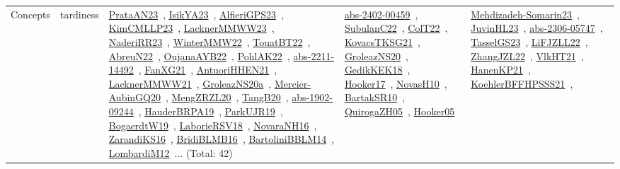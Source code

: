 {\begin{longtable}{lp{3cm}>{\raggedright\arraybackslash}p{6cm}>{\raggedright\arraybackslash}p{6cm}>{\raggedright\arraybackslash}p{8cm}}
Concepts & tardiness & \href{articles/PrataAN23.pdf}{PrataAN23}~\cite{PrataAN23}, \href{articles/IsikYA23.pdf}{IsikYA23}~\cite{IsikYA23}, \href{articles/AlfieriGPS23.pdf}{AlfieriGPS23}~\cite{AlfieriGPS23}, \href{papers/KimCMLLP23.pdf}{KimCMLLP23}~\cite{KimCMLLP23}, \href{articles/LacknerMMWW23.pdf}{LacknerMMWW23}~\cite{LacknerMMWW23}, \href{articles/NaderiRR23.pdf}{NaderiRR23}~\cite{NaderiRR23}, \href{papers/WinterMMW22.pdf}{WinterMMW22}~\cite{WinterMMW22}, \href{papers/TouatBT22.pdf}{TouatBT22}~\cite{TouatBT22}, \href{articles/AbreuN22.pdf}{AbreuN22}~\cite{AbreuN22}, \href{papers/OujanaAYB22.pdf}{OujanaAYB22}~\cite{OujanaAYB22}, \href{articles/PohlAK22.pdf}{PohlAK22}~\cite{PohlAK22}, \href{articles/abs-2211-14492.pdf}{abs-2211-14492}~\cite{abs-2211-14492}, \href{articles/FanXG21.pdf}{FanXG21}~\cite{FanXG21}, \href{papers/AntuoriHHEN21.pdf}{AntuoriHHEN21}~\cite{AntuoriHHEN21}, \href{papers/LacknerMMWW21.pdf}{LacknerMMWW21}~\cite{LacknerMMWW21}, \href{papers/GroleazNS20a.pdf}{GroleazNS20a}~\cite{GroleazNS20a}, \href{papers/Mercier-AubinGQ20.pdf}{Mercier-AubinGQ20}~\cite{Mercier-AubinGQ20}, \href{articles/MengZRZL20.pdf}{MengZRZL20}~\cite{MengZRZL20}, \href{papers/TangB20.pdf}{TangB20}~\cite{TangB20}, \href{articles/abs-1902-09244.pdf}{abs-1902-09244}~\cite{abs-1902-09244}, \href{articles/HauderBRPA19.pdf}{HauderBRPA19}~\cite{HauderBRPA19}, \href{papers/ParkUJR19.pdf}{ParkUJR19}~\cite{ParkUJR19}, \href{papers/BogaerdtW19.pdf}{BogaerdtW19}~\cite{BogaerdtW19}, \href{articles/LaborieRSV18.pdf}{LaborieRSV18}~\cite{LaborieRSV18}, \href{articles/NovaraNH16.pdf}{NovaraNH16}~\cite{NovaraNH16}, \href{articles/ZarandiKS16.pdf}{ZarandiKS16}~\cite{ZarandiKS16}, \href{articles/BridiBLMB16.pdf}{BridiBLMB16}~\cite{BridiBLMB16}, \href{papers/BartoliniBBLM14.pdf}{BartoliniBBLM14}~\cite{BartoliniBBLM14}, \href{articles/LombardiM12.pdf}{LombardiM12}~\cite{LombardiM12}... (Total: 42) & \href{articles/abs-2402-00459.pdf}{abs-2402-00459}~\cite{abs-2402-00459}, \href{articles/SubulanC22.pdf}{SubulanC22}~\cite{SubulanC22}, \href{articles/ColT22.pdf}{ColT22}~\cite{ColT22}, \href{papers/KovacsTKSG21.pdf}{KovacsTKSG21}~\cite{KovacsTKSG21}, \href{papers/GroleazNS20.pdf}{GroleazNS20}~\cite{GroleazNS20}, \href{articles/GedikKEK18.pdf}{GedikKEK18}~\cite{GedikKEK18}, \href{papers/Hooker17.pdf}{Hooker17}~\cite{Hooker17}, \href{articles/NovasH10.pdf}{NovasH10}~\cite{NovasH10}, \href{articles/BartakSR10.pdf}{BartakSR10}~\cite{BartakSR10}, \href{papers/QuirogaZH05.pdf}{QuirogaZH05}~\cite{QuirogaZH05}, \href{articles/Hooker05.pdf}{Hooker05}~\cite{Hooker05} & \href{papers/Mehdizadeh-Somarin23.pdf}{Mehdizadeh-Somarin23}~\cite{Mehdizadeh-Somarin23}, \href{papers/JuvinHL23.pdf}{JuvinHL23}~\cite{JuvinHL23}, \href{articles/abs-2306-05747.pdf}{abs-2306-05747}~\cite{abs-2306-05747}, \href{papers/TasselGS23.pdf}{TasselGS23}~\cite{TasselGS23}, \href{papers/LiFJZLL22.pdf}{LiFJZLL22}~\cite{LiFJZLL22}, \href{papers/ZhangJZL22.pdf}{ZhangJZL22}~\cite{ZhangJZL22}, \href{articles/VlkHT21.pdf}{VlkHT21}~\cite{VlkHT21}, \href{papers/HanenKP21.pdf}{HanenKP21}~\cite{HanenKP21}, \href{articles/KoehlerBFFHPSSS21.pdf}{KoehlerBFFHPSSS21}~\cite{KoehlerBFFHPSSS21}, 
\end{longtable}}
